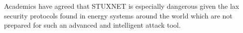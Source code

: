 \documentclass{article}
\begin{document}
Academics have agreed that STUXNET is especially dangerous given the lax security protocols found in energy systems around the world which are not prepared for such an advanced and intelligent attack tool.



\cleardoublepage


\end{document}
